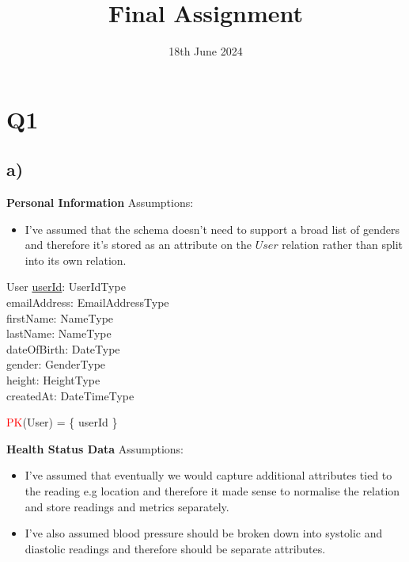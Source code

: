 \documentclass{article}
\title{Final Assignment}
\date{\vspace{-1.0cm}18th June 2024}
\begin{document}
\maketitle

\section*{Q1}

\subsection*{\small a)}
\textbf{Personal Information}
\newline \newline Assumptions:
\begin{itemize}
    \item I've assumed that the schema doesn't need to support a broad list of genders and therefore it's stored as an attribute on the $User$ relation rather than split into its own relation.
\end{itemize}
\begin{schema}{User}
	\underline{userId}: UserIdType \\
  emailAddress: EmailAddressType \\
  firstName: NameType \\
  lastName: NameType \\
  dateOfBirth: DateType \\
  gender: GenderType \\
  height: HeightType \\ 
  createdAt: DateTimeType \\
\end{schema}
\begin{zed}
\textcolor{red}{PK}(User) = \{ userId \} \\
\end{zed}
\newline
\textbf{Health Status Data}
\newline \newline Assumptions:
\begin{itemize}
  \item I've assumed that eventually we would capture additional attributes tied to the reading e.g location and therefore it made sense to normalise the relation and store readings and metrics separately.
  \item I've also assumed blood pressure should be broken down into systolic and diastolic readings and therefore should be separate attributes.
\end{itemize}
\end{document}
